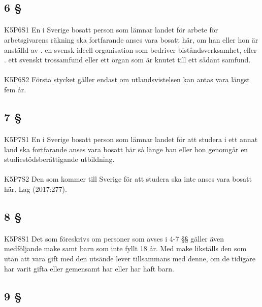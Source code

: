 \documentclass[a4paper,notitlepage,openany,10pt]{book}
\begin{document}
\subsection*{6 §}
\paragraph*{}
{\tiny K5P6S1}
En i Sverige bosatt person som lämnar landet för arbete för arbetsgivarens räkning ska fortfarande anses vara bosatt här, om han eller hon är anställd av
. en svensk ideell organisation som bedriver biståndsverksamhet, eller
. ett svenskt trossamfund eller ett organ som är knutet till ett sådant samfund.
\paragraph*{}
{\tiny K5P6S2}
Första stycket gäller endast om utlandsvistelsen kan antas vara längst fem år.
\subsection*{7 §}
\paragraph*{}
{\tiny K5P7S1}
En i Sverige bosatt person som lämnar landet för att studera i ett annat land ska fortfarande anses vara bosatt här så länge han eller hon genomgår en studiestödsberättigande utbildning.
\paragraph*{}
{\tiny K5P7S2}
Den som kommer till Sverige för att studera ska inte anses vara bosatt här.
Lag (2017:277).
\subsection*{8 §}
\paragraph*{}
{\tiny K5P8S1}
Det som föreskrivs om personer som avses i 4-7 §§ gäller även medföljande make samt barn som inte fyllt 18 år. Med make likställs den som utan att vara gift med den utsände lever tillsammans med denne, om de tidigare har varit gifta eller gemensamt har eller har haft barn.
\subsection*{9 §}
\end{document}
